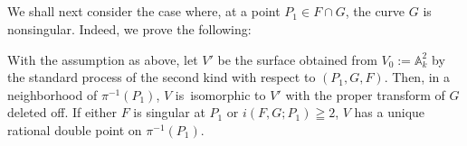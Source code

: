 \subsection{}\label{chap2:5.7}
We shall next consider the case where, at a point $P_{1}\in F\cap G$,
the curve $G$ is nonsingular. Indeed, we prove the following:

\begin{lemma*}
With the assumption as above, let $V'$ be the surface obtained from
$V_{0}:=\mathbb{A}^{2}_{k}$ by the standard process of the second kind
with respect to $(P_{1},G,F)$. Then, in a neighborhood of
$\pi^{-1}(P_{1})$, $V$ is\pageoriginale\ isomorphic to $V'$ with the
proper transform of $G$ deleted off. If either $F$ is singular at
$P_{1}$ or $i(F,G;P_{1})\geqq 2$, $V$ has a unique rational double
point on $\pi^{-1}(P_{1})$.
\end{lemma*}

